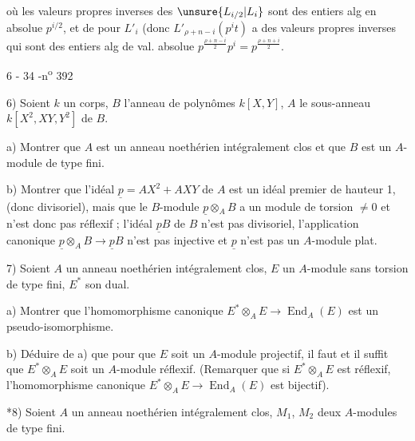 
où les valeurs propres inverses des $\unsure{L_{i/2}|L_i}$ sont des entiers alg en  absolue $p^{i/2}$, et de  pour $L'_i$ (donc $L'_{\rho+n-i}(p^it)$ a des valeurs propres inverses qui sont des entiers alg de val. absolue $p^{\frac{\rho+n-i}{2}}p^i=p^{\frac{\rho+n+i}{2}}$.

\begin{center}6 - 34 -\hfill n\textsuperscript{o} 392\end{center}

6) Soient $k$ un corps, $B$ l'anneau de polynômes $k[X,Y]$, $A$ le sous-anneau $k[X^2,XY,Y^2]$ de $B$.

a) Montrer que $A$ est un anneau noethérien intégralement clos et que $B$ est un $A$-module de type fini.

b) Montrer que l'idéal $\underline p=AX^2+AXY$ de $A$ est un idéal premier de hauteur 1, (donc divisoriel), mais que le $B$-module $\underline p\otimes_A B$ a un module de torsion $\ne0$ et n'est donc pas réflexif ; l'idéal $\underline pB$ de $B$ n'est pas divisoriel, l'application canonique $\underline p\otimes_A B\longrightarrow\underline pB$ n'est pas injective et $\underline p$ n'est pas un $A$-module plat.

7) Soient $A$ un anneau noethérien intégralement clos, $E$ un $A$-module sans torsion de type fini, $E^*$ son dual.

a) Montrer que l'homomorphisme canonique $E^*\otimes_A E\longrightarrow\operatorname{End}_A(E)$ est un pseudo-isomorphisme.

b) Déduire de a) que pour que $E$ soit un $A$-module projectif, il faut et il suffit que $E^*\otimes_A E$ soit un $A$-module réflexif. (Remarquer que si $E^*\otimes_A E$ est réflexif, l'homomorphisme canonique $E^*\otimes_A E\longrightarrow\operatorname{End}_A(E)$ est bijectif).

*8) Soient $A$ un anneau noethérien intégralement clos, $M_1$, $M_2$ deux $A$-modules de type fini.

